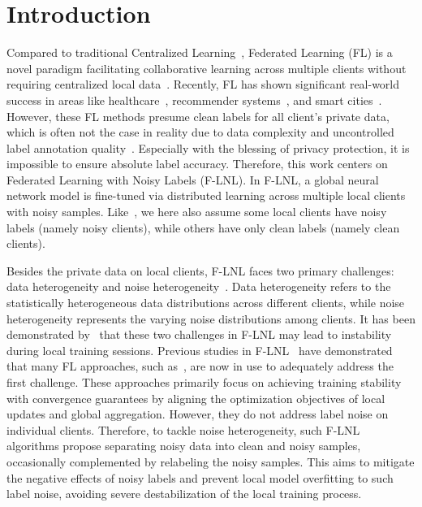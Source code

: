 \documentclass[letterpaper]{article} %
\begin{document}
\section{Introduction}

Compared to traditional Centralized Learning~\cite{li2019relation, li2021cross, li2019semi, wu2019mutual, wu2019enhancing, huang2023divide}, Federated Learning (FL) is a novel paradigm facilitating collaborative learning across multiple clients without requiring centralized local data~\cite{FedAvg}. Recently, FL has shown significant real-world success in areas like healthcare~\cite{healthcare1}, recommender systems~\cite{recommendation1}, and smart cities~\cite{smartcity1}. However, these FL methods presume clean labels for all client's private data, which is often not the case in reality due to data complexity and uncontrolled label annotation quality~\cite{tanno2019learning, kuznetsova2020open}. Especially with the blessing of privacy protection, it is impossible to ensure absolute label accuracy. Therefore, this work centers on Federated Learning with Noisy Labels (F-LNL). In F-LNL, a global neural network model is fine-tuned via distributed learning across multiple local clients with noisy samples. Like~\cite{xu2022fedcorr},  we here also assume some local clients have noisy labels (namely noisy clients), while others have only clean labels (namely clean clients).

Besides the private data on local clients, F-LNL faces two primary challenges: data heterogeneity and noise heterogeneity~\cite{kim2022fedrn,RoFL}. Data heterogeneity refers to the statistically heterogeneous data distributions across different clients, while noise heterogeneity represents the varying noise distributions among clients. It has been demonstrated by~\cite{xu2022fedcorr,kim2022fedrn} that these two challenges in F-LNL may lead to instability during local training sessions.
Previous studies in F-LNL~\cite{xu2022fedcorr,kim2022fedrn} have demonstrated that many FL approaches, such as~\cite{FedAvg, FedProx}, are now in use to adequately address the first challenge. These approaches primarily focus on achieving training stability with convergence guarantees by aligning the optimization objectives of local updates and global aggregation. However, they do not address label noise on individual clients. Therefore, to tackle noise heterogeneity, such F-LNL algorithms propose separating noisy data into clean and noisy samples, occasionally complemented by relabeling the noisy samples. This aims to mitigate the negative effects of noisy labels and prevent local model overfitting to such label noise, avoiding severe destabilization of the local training process.
\end{document}
